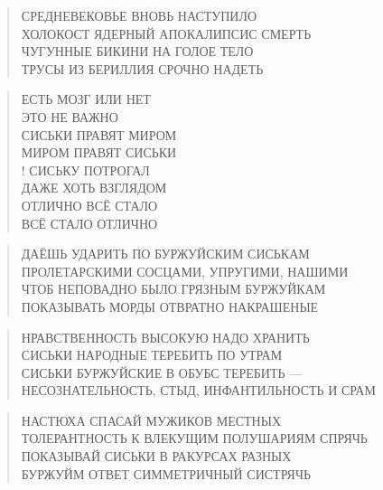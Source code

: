 \poemtitle{***}
\begin{verse}
СРЕДНЕВЕКОВЬЕ ВНОВЬ НАСТУПИЛО\\
ХОЛОКОСТ ЯДЕРНЫЙ АПОКАЛИПСИС СМЕРТЬ\\
ЧУГУННЫЕ БИКИНИ НА ГОЛОЕ ТЕЛО\\
ТРУСЫ ИЗ БЕРИЛЛИЯ СРОЧНО НАДЕТЬ
\end{verse}

\poemtitle{***}
\begin{verse}
ЕСТЬ МОЗГ ИЛИ НЕТ\\
ЭТО НЕ ВАЖНО\\
СИСЬКИ ПРАВЯТ МИРОМ\\
МИРОМ ПРАВЯТ СИСЬКИ\\!
СИСЬКУ ПОТРОГАЛ\\
ДАЖЕ ХОТЬ ВЗГЛЯДОМ\\
ОТЛИЧНО ВСЁ СТАЛО\\
ВСЁ СТАЛО ОТЛИЧНО
\end{verse}

\poemtitle{***}
\begin{verse}
ДАЁШЬ УДАРИТЬ ПО БУРЖУЙСКИМ СИСЬКАМ\\
ПРОЛЕТАРСКИМИ СОСЦАМИ, УПРУГИМИ, НАШИМИ\\
ЧТОБ НЕПОВАДНО БЫЛО ГРЯЗНЫМ БУРЖУЙКАМ\\
ПОКАЗЫВАТЬ МОРДЫ ОТВРАТНО НАКРАШЕНЫЕ
\end{verse}

\poemtitle{***}
\begin{verse}
НРАВСТВЕННОСТЬ ВЫСОКУЮ НАДО ХРАНИТЬ\\
СИСЬКИ НАРОДНЫЕ ТЕРЕБИТЬ ПО УТРАМ\\
СИСЬКИ БУРЖУЙСКИЕ В ОБУБС ТЕРЕБИТЬ —\\
НЕСОЗНАТЕЛЬНОСТЬ, СТЫД, ИНФАНТИЛЬНОСТЬ И СРАМ
\end{verse}

\poemtitle{***}
\begin{verse}
НАСТЮХА СПАСАЙ МУЖИКОВ МЕСТНЫХ\\
ТОЛЕРАНТНОСТЬ К ВЛЕКУЩИМ ПОЛУШАРИЯМ СПРЯЧЬ\\
ПОКАЗЫВАЙ СИСЬКИ В РАКУРСАХ РАЗНЫХ\\
БУРЖУЙМ ОТВЕТ СИММЕТРИЧНЫЙ СИСТРЯЧЬ
\end{verse}

